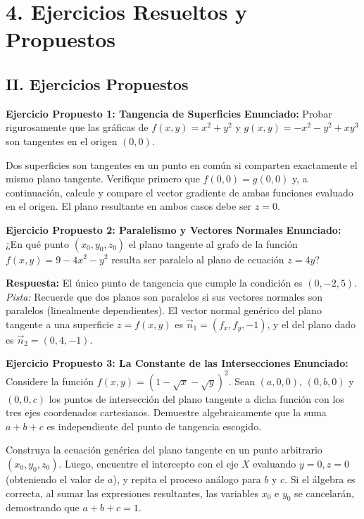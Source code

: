 \documentclass[11pt]{article}
\newenvironment{ejercicios}{%
  \section*{4. Ejercicios Resueltos y Propuestos}%
}{}
\newcommand{\enunciado}[1]{\textbf{Enunciado:} #1\par\vspace{0.2cm}}
\begin{document}
\begin{ejercicios}
  

  \vspace{0.5cm}
  \subsection*{II. Ejercicios Propuestos}
  \vspace{0.2cm}

  \textbf{Ejercicio Propuesto 1: Tangencia de Superficies}
  \enunciado{
    Probar rigurosamente que las gráficas de $f(x,y) = x^2 + y^2$ y $g(x,y) = -x^2 - y^2 + xy^3$ son tangentes en el origen $(0,0)$.
  }
  \begin{tcolorbox}[colback=yellow!5,colframe=yellow!60!black,title=Indicación Estratégica]
    Dos superficies son tangentes en un punto en común si comparten exactamente el mismo plano tangente. Verifique primero que $f(0,0)=g(0,0)$ y, a continuación, calcule y compare el vector gradiente de ambas funciones evaluado en el origen. El plano resultante en ambos casos debe ser $z=0$.
  \end{tcolorbox}
  \vspace{0.3cm}

  \textbf{Ejercicio Propuesto 2: Paralelismo y Vectores Normales}
  \enunciado{
    ¿En qué punto $(x_0, y_0, z_0)$ el plano tangente al grafo de la función $f(x,y) = 9 - 4x^2 - y^2$ resulta ser paralelo al plano de ecuación $z = 4y$?
  }
  \begin{tcolorbox}[colback=yellow!5,colframe=yellow!60!black,title=Respuesta y Pista Analítica]
    \textbf{Respuesta:} El único punto de tangencia que cumple la condición es $(0, -2, 5)$. \\
    \textit{Pista:} Recuerde que dos planos son paralelos si sus vectores normales son paralelos (linealmente dependientes). El vector normal genérico del plano tangente a una superficie $z=f(x,y)$ es $\vec{n}_1 = (f_x, f_y, -1)$, y el del plano dado es $\vec{n}_2 = (0, 4, -1)$.
  \end{tcolorbox}
  \vspace{0.3cm}

  \textbf{Ejercicio Propuesto 3: La Constante de las Intersecciones}
  \enunciado{
    Considere la función $f(x,y) = \left( 1-\sqrt{x} -\sqrt{y} \right)^2$. 
    Sean $(a,0,0)$, $(0,b,0)$ y $(0,0,c)$ los puntos de intersección del plano tangente a dicha función con los tres ejes coordenados cartesianos. Demuestre algebraicamente que la suma $a+b+c$ es independiente del punto de tangencia escogido.
  }
  \begin{tcolorbox}[colback=yellow!5,colframe=yellow!60!black,title=Indicación Estratégica]
    Construya la ecuación genérica del plano tangente en un punto arbitrario $(x_0, y_0, z_0)$. Luego, encuentre el intercepto con el eje $X$ evaluando $y=0, z=0$ (obteniendo el valor de $a$), y repita el proceso análogo para $b$ y $c$. Si el álgebra es correcta, al sumar las expresiones resultantes, las variables $x_0$ e $y_0$ se cancelarán, demostrando que $a+b+c = 1$.
  \end{tcolorbox}


\end{ejercicios}
\end{document}
